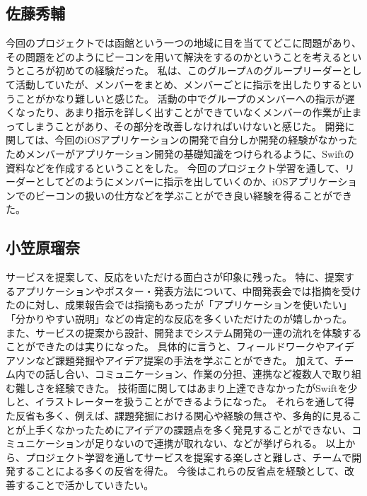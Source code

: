 \documentclass[openany,11pt,papersize]{jsbook}
\begin{document}

\subsection{佐藤秀輔}
今回のプロジェクトでは函館という一つの地域に目を当ててどこに問題があり、その問題をどのようにビーコンを用いて解決をするのかということを考えるというところが初めての経験だった。
私は、このグループAのグループリーダーとして活動していたが、メンバーをまとめ、メンバーごとに指示を出したりするということがかなり難しいと感じた。
活動の中でグループのメンバーへの指示が遅くなったり、あまり指示を詳しく出すことができていなくメンバーの作業が止まってしまうことがあり、その部分を改善しなければいけないと感じた。
開発に関しては、今回のiOSアプリケーションの開発で自分しか開発の経験がなかったためメンバーがアプリケーション開発の基礎知識をつけられるように、Swiftの資料などを作成するということをした。
今回のプロジェクト学習を通して、リーダーとしてどのようにメンバーに指示を出していくのか、iOSアプリケーションでのビーコンの扱いの仕方などを学ぶことができ良い経験を得ることができた。


\subsection{小笠原瑠奈}
サービスを提案して、反応をいただける面白さが印象に残った。
特に、提案するアプリケーションやポスター・発表方法について、中間発表会では指摘を受けたのに対し、成果報告会では指摘もあったが「アプリケーションを使いたい」「分かりやすい説明」などの肯定的な反応を多くいただけたのが嬉しかった。
また、サービスの提案から設計、開発までシステム開発の一連の流れを体験することができたのは実りになった。
具体的に言うと、フィールドワークやアイデアソンなど課題発掘やアイデア提案の手法を学ぶことができた。
加えて、チーム内での話し合い、コミュニケーション、作業の分担、連携など複数人で取り組む難しさを経験できた。
技術面に関してはあまり上達できなかったがSwiftを少しと、イラストレーターを扱うことができるようになった。
それらを通して得た反省も多く、例えば、課題発掘における関心や経験の無さや、多角的に見ることが上手くなかったためにアイデアの課題点を多く発見することができない、コミュニケーションが足りないので連携が取れない、などが挙げられる。
以上から、プロジェクト学習を通してサービスを提案する楽しさと難しさ、チームで開発することによる多くの反省を得た。
今後はこれらの反省点を経験として、改善することで活かしていきたい。

\end{document}
